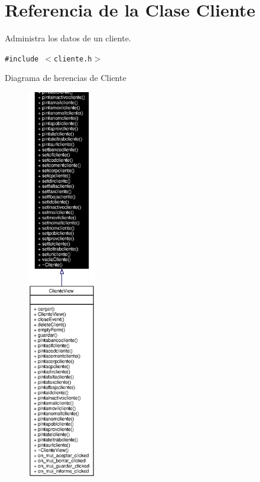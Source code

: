 \section{Referencia de la Clase Cliente}
\label{classCliente}
Administra los datos de un cliente.  


{\tt \#include $<$cliente.h$>$}

Diagrama de herencias de Cliente\begin{figure}[H]
\begin{center}
\leavevmode
\includegraphics[width=85pt]{classCliente__inherit__graph}
\end{center}
\end{figure}

